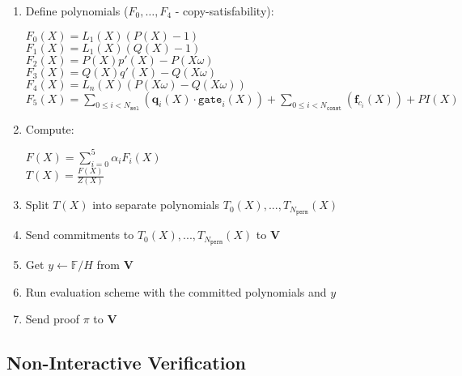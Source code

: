 \begin{enumerate}
	\item Define polynomials ($F_0, \dots, F_4$ - copy-satisfability):
	\begin{center}
		$F_0(X) = L_1(X)(P(X) - 1)$\\
		$F_1(X) = L_1(X)(Q(X) - 1)$ \\
		$F_2(X) = P(X)p'(X) - P(X\omega)$ \\
		$F_3(X) = Q(X)q'(X) - Q(X\omega)$ \\
		$F_4(X) = L_n(X)(P(X\omega) - Q(X\omega))$ \\
		$F_5(X) = \sum\limits_{0 \leq i < N_{\texttt{sel}}} (\textbf{q}_{i}(X) \cdot \texttt{gate}_i(X))
			+ \sum\limits_{0 \leq i < N_{\texttt{const}}}(\textbf{f}_{c_i}(X)) + PI(X)$
	\end{center}
	\item Compute:
	\begin{center}
		$F(X) = \sum\limits_{i = 0}^5 \alpha_iF_i(X)$ \\
		$T(X) = \frac{F(X)}{Z(X)}$
	\end{center}
	\item Split $T(X)$ into separate polynomials $T_0(X), ..., T_{N_{\texttt{perm}}}(X)$
	\item Send commitments to $T_0(X), ..., T_{N_{\texttt{perm}}}(X)$ to \textbf{V}
	\item Get $y \leftarrow \mathbb{F}/H$ from \textbf{V}
	\item Run evaluation scheme with the committed polynomials and $y$
	\item Send proof $\pi$ to $\textbf{V}$
\end{enumerate}

\subsection{Non-Interactive Verification}

